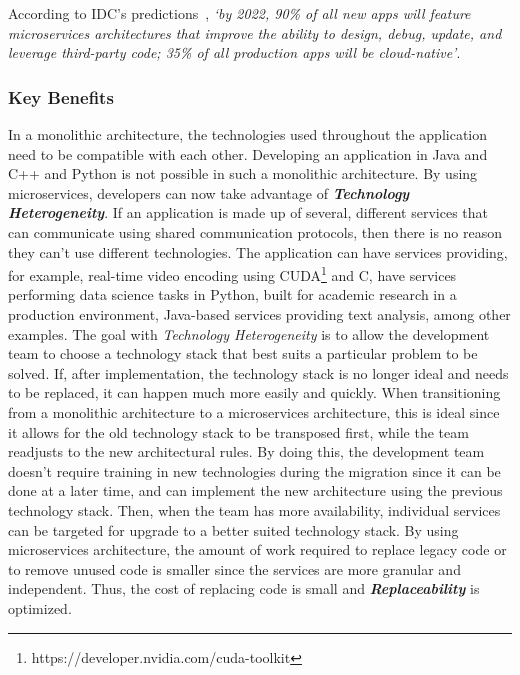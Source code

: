 


According to IDC's predictions~\Parencite{idc_2019}, \textit{`by 2022, 90\% of all new apps will feature microservices architectures that improve the ability to design, debug, update, and leverage third-party code; 35\% of all production apps will be cloud-native'}.



\subsubsection{Key Benefits}\label{state-of-the-art:sss:key-benefits}

In a monolithic architecture, the technologies used throughout the application need to be compatible with each other. Developing an application in Java and C++ and Python is not possible in such a monolithic architecture. 
By using microservices, developers can now take advantage of \textbf{\textit{Technology Heterogeneity}}. If an application is made up of several, different services that can communicate using shared communication protocols, then there is no reason they can't use different technologies. The application can have services providing, for example, real-time video encoding using CUDA\footnote{\label{foot:cuda}https://developer.nvidia.com/cuda-toolkit} and C, have services performing data science tasks in Python, built for academic research in a production environment, Java-based services providing text analysis, among other examples. The goal with \textit{Technology Heterogeneity} is to allow the development team to choose a technology stack that best suits a particular problem to be solved. If, after implementation, the technology stack is no longer ideal and needs to be replaced, it can happen much more easily and quickly. When transitioning from a monolithic architecture to a microservices architecture, this is ideal since it allows for the old technology stack to be transposed first, while the team readjusts to the new architectural rules. By doing this, the development team doesn't require training in new technologies during the migration since it can be done at a later time, and can implement the new architecture using the previous technology stack. Then, when the team has more availability, individual services can be targeted for upgrade to a better suited technology stack. By using microservices architecture, the amount of work required to replace legacy code or to remove unused code is smaller since the services are more granular and independent. Thus, the cost of replacing code is small and \textbf{\textit{Replaceability}} is optimized.

